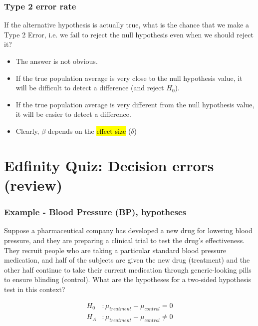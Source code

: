 \documentclass[slidestop,compress,mathserif]{beamer}
\newcommand{\soln}[1]{\textit{#1}}
\begin{document}
\begin{frame}
\frametitle{Type 2 error rate}

If the alternative hypothesis is actually true, what is the chance that we make a Type 2 Error, i.e. we fail to reject the null hypothesis even when we should reject it?

\begin{itemize}

\item The answer is not obvious.

\item If the true population average is very close to the null hypothesis value, it will be difficult to detect a difference (and reject $H_0$).

\item If the true population average is very different from the null hypothesis value, it will be easier to detect a difference.

\item Clearly, $\beta$ depends on the \hl{effect size} ($\delta$)
\end{itemize}

\end{frame}


\section{Edfinity Quiz: Decision errors (review)}


\begin{frame}
\frametitle{Example - Blood Pressure (BP), hypotheses}

{\dq
{\footnotesize
Suppose a pharmaceutical company has developed a new drug for lowering blood pressure, and they are preparing a clinical trial to test the drug's effectiveness. They recruit people who are taking a particular standard blood pressure medication, and half of the subjects are given the new drug (treatment) and the other half continue to take their current medication through generic-looking pills to ensure blinding (control). What are the hypotheses for a two-sided hypothesis test in this context?
}
}

\pause

\soln{
\begin{align*}
H_0&: \mu_{treatment} - \mu_{control} = 0 \\
H_A&: \mu_{treatment} - \mu_{control} \ne 0  
\end{align*}
}

\end{frame}
\end{document}
